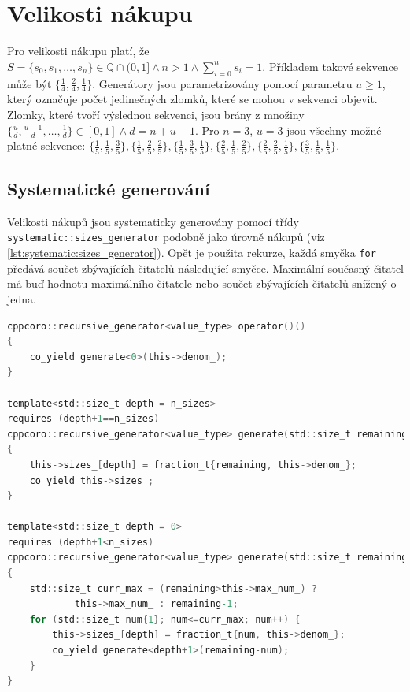 \section{Velikosti nákupu}
Pro velikosti nákupu platí, že $ S=\{s_0, s_1,\dots,s_n\} \in \mathbb{Q} \cap (0, 1] \land n>1 \land \sum_{i=0}^{n} s_i = 1 $.
Příkladem takové sekvence může být $ \{\frac{1}{4}, \frac{2}{4}, \frac{1}{4}\} $.
Generátory jsou parametrizovány pomocí parametru $u\geq 1$, který označuje počet jedinečných zlomků, které se mohou v sekvenci objevit.
Zlomky, které tvoří výslednou sekvenci, jsou brány z množiny $\{\frac{u}{d}, \frac{u-1}{d},\dots, \frac{1}{d}\} \in [0, 1] \land d=n+u-1$.
Pro $n=3$, $u=3$ jsou všechny možné platné sekvence: $\{\frac{1}{5}, \frac{1}{5}, \frac{3}{5}\}, \{\frac{1}{5}, \frac{2}{5}, \frac{2}{5}\}, \{\frac{1}{5}, \frac{3}{5}, \frac{1}{5}\}, \{\frac{2}{5}, \frac{1}{5}, \frac{2}{5}\}, \{\frac{2}{5}, \frac{2}{5}, \frac{1}{5}\}, \{\frac{3}{5}, \frac{1}{5}, \frac{1}{5}\}$.

\subsection{Systematické generování}
Velikosti nákupů jsou systematicky generovány pomocí třídy \texttt{systematic::sizes\_generator} podobně jako úrovně nákupů (viz \ref{lst:systematic:sizes_generator}).
Opět je použita rekurze, každá smyčka \texttt{for} předává součet zbývajících čitatelů následující smyčce.
Maximální současný čitatel má buď hodnotu maximálního čitatele nebo součet zbývajících čitatelů snížený o jedna.

\begin{lstlisting}[caption={~Metody pro systematické generování velikostí nákupu},label={lst:systematic:sizes_generator},captionpos=t,abovecaptionskip=-\medskipamount,belowcaptionskip=\medskipamount,language=C]
cppcoro::recursive_generator<value_type> operator()()
{
    co_yield generate<0>(this->denom_);
}

template<std::size_t depth = n_sizes>
requires (depth+1==n_sizes)
cppcoro::recursive_generator<value_type> generate(std::size_t remaining)
{
    this->sizes_[depth] = fraction_t{remaining, this->denom_};
    co_yield this->sizes_;
}

template<std::size_t depth = 0>
requires (depth+1<n_sizes)
cppcoro::recursive_generator<value_type> generate(std::size_t remaining)
{
    std::size_t curr_max = (remaining>this->max_num_) ?
            this->max_num_ : remaining-1;
    for (std::size_t num{1}; num<=curr_max; num++) {
        this->sizes_[depth] = fraction_t{num, this->denom_};
        co_yield generate<depth+1>(remaining-num);
    }
}
\end{lstlisting}

